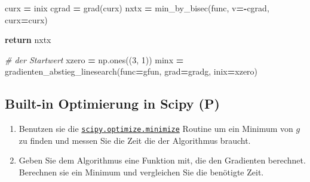 \documentclass[]{book}
\newenvironment{Shaded}{\begin{snugshade}}{\end{snugshade}}
\newcommand{\CommentTok}[1]{\textcolor[rgb]{0.56,0.35,0.01}{\textit{#1}}}
\newcommand{\ControlFlowTok}[1]{\textcolor[rgb]{0.13,0.29,0.53}{\textbf{#1}}}
\newcommand{\DecValTok}[1]{\textcolor[rgb]{0.00,0.00,0.81}{#1}}
\newcommand{\NormalTok}[1]{#1}
\newcommand{\OperatorTok}[1]{\textcolor[rgb]{0.81,0.36,0.00}{\textbf{#1}}}
\theoremstyle{definition}
\theoremstyle{definition}
\theoremstyle{definition}
\theoremstyle{definition}
\theoremstyle{remark}
\begin{document}
\begin{Shaded}
\begin{Highlighting}[]
\NormalTok{    curx }\OperatorTok{=}\NormalTok{ inix}
\NormalTok{    cgrad }\OperatorTok{=}\NormalTok{ grad(curx)}
\NormalTok{    nxtx }\OperatorTok{=}\NormalTok{ min_by_bisec(func, v}\OperatorTok{=-}\NormalTok{cgrad, curx}\OperatorTok{=}\NormalTok{curx)}

    \ControlFlowTok{return}\NormalTok{ nxtx}

\CommentTok{# der Startwert}
\NormalTok{xzero }\OperatorTok{=}\NormalTok{ np.ones((}\DecValTok{3}\NormalTok{, }\DecValTok{1}\NormalTok{))}
\NormalTok{minx }\OperatorTok{=}\NormalTok{ gradienten_abstieg_linesearch(func}\OperatorTok{=}\NormalTok{gfun, grad}\OperatorTok{=}\NormalTok{gradg, inix}\OperatorTok{=}\NormalTok{xzero)}
\end{Highlighting}
\end{Shaded}

\hypertarget{built-in-optimierung-in-scipy-p}{%
\subsection{Built-in Optimierung in Scipy (P)}\label{built-in-optimierung-in-scipy-p}}

\begin{enumerate}
\def\labelenumi{\arabic{enumi}.}
\item
  Benutzen sie die \href{https://docs.scipy.org/doc/scipy/reference/generated/scipy.optimize.minimize.html\#scipy.optimize.minimize}{\texttt{scipy.optimize.minimize}} Routine um ein Minimum von \(g\) zu finden und messen Sie die Zeit die der Algorithmus braucht.
\item
  Geben Sie dem Algorithmus eine Funktion mit, die den Gradienten berechnet. Berechnen sie ein Minimum und vergleichen Sie die benötigte Zeit.
\end{enumerate}
\end{document}
